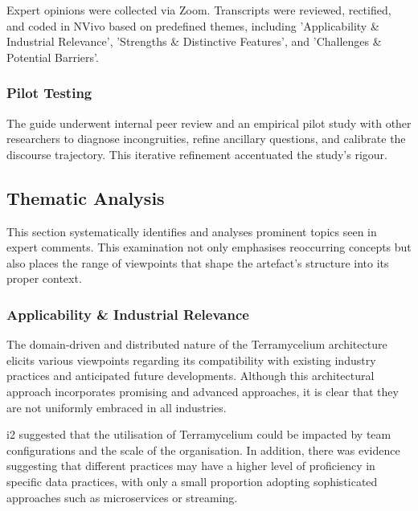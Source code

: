 \documentclass[review]{elsarticle}
\begin{document}
    

  

  Expert opinions were collected via Zoom. Transcripts were reviewed, rectified, and coded in NVivo based on predefined themes, including 'Applicability \& Industrial Relevance', 'Strengths \& Distinctive Features', and 'Challenges \& Potential Barriers'.

  

  \subsubsection{Pilot Testing}

  

  The guide underwent internal peer review and an empirical pilot study with other researchers to diagnose incongruities, refine ancillary questions, and calibrate the discourse trajectory. This iterative refinement accentuated the study's rigour.

\subsection{Thematic Analysis} \label{expertOpinion_thematicAnalysis}

This section systematically identifies and analyses prominent topics seen in expert comments. This examination not only emphasises reoccurring concepts but also places the range of viewpoints that shape the artefact's structure into its proper context.

\subsubsection{Applicability \& Industrial Relevance}

The domain-driven and distributed nature of the Terramycelium architecture elicits various viewpoints regarding its compatibility with existing industry practices and anticipated future developments. Although this architectural approach incorporates promising and advanced approaches, it is clear that they are not uniformly embraced in all industries.

i2 suggested that the utilisation of Terramycelium could be impacted by team configurations and the scale of the organisation. In addition, there was evidence suggesting that different practices may have a higher level of proficiency in specific data practices, with only a small proportion adopting sophisticated approaches such as microservices or streaming.
\end{document}
